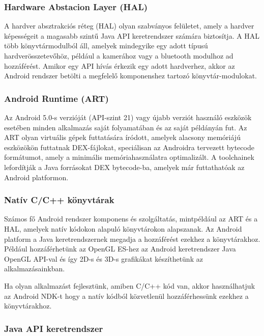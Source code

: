 \documentclass[../main.tex]{subfiles}
\begin{document}
        \subsubsection{Hardware Abstacion Layer (HAL)}
             A hardver absztrakciós réteg (HAL) olyan szabványos felületet, amely a hardver képességeit a magasabb szintű Java API keretrendszer számára biztosítja. A HAL több könyvtármodulból áll,  amelyek mindegyike egy adott típusú hardverösszetevőhöz, például a kamerához vagy a bluetooth modulhoz ad hozzáférést. Amikor egy API hívás érkezik egy adott hardverhez, akkor az Android rendszer betölti a megfelelő komponenshez tartozó könyvtár-modulokat.
            
        \subsubsection{Android Runtime (ART)}
            Az Android 5.0-s verzióját (API-szint 21) vagy újabb verziót használó eszközök esetében minden alkalmazás saját folyamatában és az saját példányán fut. Az ART olyan virtuális gépek futtatására íródott, amelyek alacsony memóriájú eszközökön futtatnak DEX-fájlokat, speciálisan az Androidra tervezett bytecode formátumot, amely a minimális memóriahasználatra optimalizált. A toolchainek lefordítják a Java forrásokat DEX bytecode-ba, amelyek már futtathatóak az Android platformon.
            
        \subsubsection{Natív C/C++ könyvtárak}
            Számos fő Android rendszer komponens és szolgáltatás, mintpéldául az ART és a HAL, amelyek natív kódokon alapuló könyvtárokon alapszanak. Az Android platform a Java keretrendszernek megadja a hozzáférést ezekhez a könyvtárakhoz. Például hozzáférhetünk az OpenGL ES-hez az Android keretrendszer Java OpenGL API-val és így 2D-s és 3D-s grafikákat készíthetünk az alkalmazásainkban.
            
            Ha olyan alkalmazást fejlesztünk, amiben C/C++ kód van, akkor használhatjuk az Android NDK-t hogy a natív kódból közvetlenül hozzáférhessünk ezekhez a könyvtárakhoz.
            
        \subsubsection{Java API keretrendszer}
            
\end{document}
